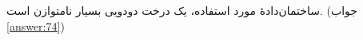 \section{}
\paragraph{}\label{hint:323}
ساختمان‌دادهٔ مورد استفاده، یک درخت دودویی بسیار نامتوازن است. (جواب \ref{answer:74})